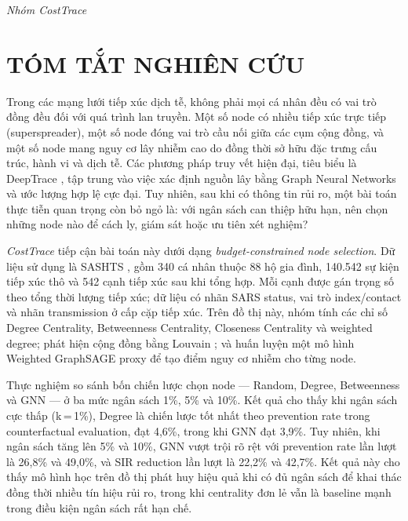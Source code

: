 \documentclass[12pt,a4paper]{report}
\theoremstyle{definition}
\begin{document}
\noindent\textit{Nhóm CostTrace}

\chapter*{TÓM TẮT NGHIÊN CỨU}

Trong các mạng lưới tiếp xúc dịch tễ, không phải mọi cá nhân đều có vai trò đồng đều đối với quá trình lan truyền. Một số node có nhiều tiếp xúc trực tiếp (superspreader), một số node đóng vai trò cầu nối giữa các cụm cộng đồng, và một số node mang nguy cơ lây nhiễm cao do đồng thời sở hữu đặc trưng cấu trúc, hành vi và dịch tễ. Các phương pháp truy vết hiện đại, tiêu biểu là DeepTrace \cite{deepTrace2025}, tập trung vào việc xác định nguồn lây bằng Graph Neural Networks và ước lượng hợp lệ cực đại. Tuy nhiên, sau khi có thông tin rủi ro, một bài toán thực tiễn quan trọng còn bỏ ngỏ là: với ngân sách can thiệp hữu hạn, nên chọn những node nào để cách ly, giám sát hoặc ưu tiên xét nghiệm?

\textit{CostTrace} tiếp cận bài toán này dưới dạng \textit{budget-constrained node selection}. Dữ liệu sử dụng là SASHTS \cite{sashts2021}, gồm 340 cá nhân thuộc 88 hộ gia đình, 140.542 sự kiện tiếp xúc thô và 542 cạnh tiếp xúc sau khi tổng hợp. Mỗi cạnh được gán trọng số theo tổng thời lượng tiếp xúc; dữ liệu có nhãn SARS status, vai trò index/contact và nhãn transmission ở cấp cặp tiếp xúc. Trên đồ thị này, nhóm tính các chỉ số Degree Centrality, Betweenness Centrality, Closeness Centrality và weighted degree; phát hiện cộng đồng bằng Louvain \cite{louvain2008}; và huấn luyện một mô hình Weighted GraphSAGE proxy \cite{graphsage2017} để tạo điểm nguy cơ nhiễm cho từng node.

Thực nghiệm so sánh bốn chiến lược chọn node --- Random, Degree, Betweenness và GNN --- ở ba mức ngân sách 1\%, 5\% và 10\%. Kết quả cho thấy khi ngân sách cực thấp (k\,=\,1\%), Degree là chiến lược tốt nhất theo prevention rate trong counterfactual evaluation, đạt 4,6\%, trong khi GNN đạt 3,9\%. Tuy nhiên, khi ngân sách tăng lên 5\% và 10\%, GNN vượt trội rõ rệt với prevention rate lần lượt là 26,8\% và 49,0\%, và SIR reduction lần lượt là 22,2\% và 42,7\%. Kết quả này cho thấy mô hình học trên đồ thị phát huy hiệu quả khi có đủ ngân sách để khai thác đồng thời nhiều tín hiệu rủi ro, trong khi centrality đơn lẻ vẫn là baseline mạnh trong điều kiện ngân sách rất hạn chế.
\end{document}
